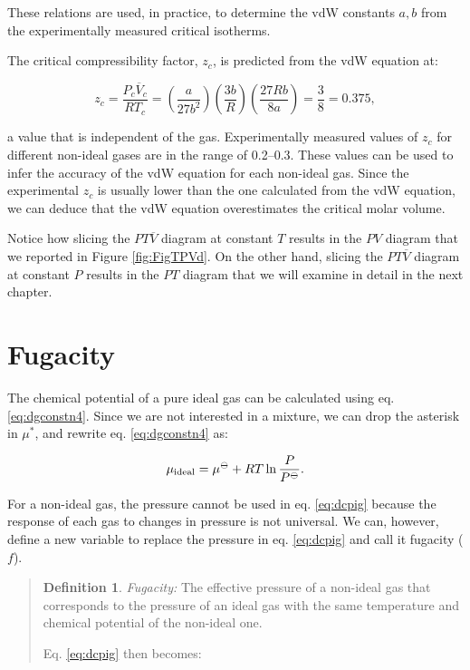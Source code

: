 \documentclass[
  9pt,
]{extbook}
\theoremstyle{definition}
\newtheorem{definition}{Definition}[chapter]
\theoremstyle{definition}
\theoremstyle{definition}
\theoremstyle{remark}
\begin{document}
These relations are used, in practice, to determine the vdW constants \(a,b\) from the experimentally measured critical isotherms.

The critical compressibility factor, \(z_c\), is predicted from the vdW equation at:

\begin{equation}
z_c=\frac{P_c \overline{V}_c}{R T_c}=\left( \frac{a}{27b^2} \right) \left( \frac{3b}{R} \right) \left( \frac{27Rb}{8a} \right) = \frac{3}{8} = 0.375,
\label{eq:critiz}
\end{equation}

a value that is independent of the gas. Experimentally measured values of \(z_c\) for different non-ideal gases are in the range of 0.2--0.3. These values can be used to infer the accuracy of the vdW equation for each non-ideal gas. Since the experimental \(z_c\) is usually lower than the one calculated from the vdW equation, we can deduce that the vdW equation overestimates the critical molar volume.

Notice how slicing the \(PT\overline{V}\) diagram at constant \(T\) results in the \(PV\) diagram that we reported in Figure \ref{fig:FigTPVd}. On the other hand, slicing the \(PT\overline{V}\) diagram at constant \(P\) results in the \(PT\) diagram that we will examine in detail in the next chapter.

\hypertarget{fugacity}{%
\section{Fugacity}\label{fugacity}}

The chemical potential of a pure ideal gas can be calculated using eq. \eqref{eq:dgconstn4}. Since we are not interested in a mixture, we can drop the asterisk in \(\mu^*\), and rewrite eq. \eqref{eq:dgconstn4} as:

\begin{equation}
\mu_{\text{ideal}} = \mu^{-\kern-6pt{\ominus}\kern-6pt-}+ RT \ln \frac{P}{P^{-\kern-6pt{\ominus}\kern-6pt-}}.
\label{eq:dcpig}
\end{equation}

For a non-ideal gas, the pressure cannot be used in eq. \eqref{eq:dcpig} because the response of each gas to changes in pressure is not universal. We can, however, define a new variable to replace the pressure in eq. \eqref{eq:dcpig} and call it fugacity (\(f\)).

\begin{quote}
\begin{definition}
\protect\hypertarget{def:fugacitydef}{}{\label{def:fugacitydef} }\emph{Fugacity:} The effective pressure of a non-ideal gas that corresponds to the pressure of an ideal gas with the same temperature and chemical potential of the non-ideal one.
\end{definition}

Eq. \eqref{eq:dcpig} then becomes:
\end{quote}
\end{document}
